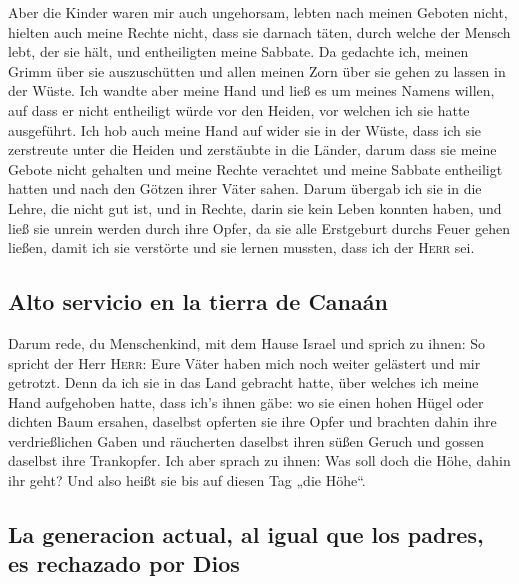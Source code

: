  Aber die Kinder waren mir auch ungehorsam, lebten nach
meinen Geboten nicht, hielten auch meine Rechte nicht, dass sie darnach
täten, durch welche der Mensch lebt, der sie hält, und entheiligten
meine Sabbate. Da gedachte ich, meinen Grimm über sie auszuschütten und
allen meinen Zorn über sie gehen zu lassen in der Wüste. 
Ich wandte aber meine Hand und ließ es um meines Namens willen, auf dass
er nicht entheiligt würde vor den Heiden, vor welchen ich sie hatte
ausgeführt.  Ich hob auch meine Hand auf wider sie in der
Wüste, dass ich sie zerstreute unter die Heiden und zerstäubte in die
Länder,  darum dass sie meine Gebote nicht gehalten und
meine Rechte verachtet und meine Sabbate entheiligt hatten und nach den
Götzen ihrer Väter sahen.  Darum übergab ich sie in die
Lehre, die nicht gut ist, und in Rechte, darin sie kein Leben konnten
haben,  und ließ sie unrein werden durch ihre Opfer, da
sie alle Erstgeburt durchs Feuer gehen ließen, damit ich sie verstörte
und sie lernen mussten, dass ich der \textsc{Herr} sei.

\hypertarget{alto-servicio-en-la-tierra-de-canauxe1n}{%
\subsection{Alto servicio en la tierra de
Canaán}\label{alto-servicio-en-la-tierra-de-canauxe1n}}

 Darum rede, du Menschenkind, mit dem Hause Israel und
sprich zu ihnen: So spricht der Herr \textsc{Herr}: Eure Väter haben
mich noch weiter gelästert und mir getrotzt.  Denn da ich
sie in das Land gebracht hatte, über welches ich meine Hand aufgehoben
hatte, dass ich's ihnen gäbe: wo sie einen hohen Hügel oder dichten Baum
ersahen, daselbst opferten sie ihre Opfer und brachten dahin ihre
verdrießlichen Gaben und räucherten daselbst ihren süßen Geruch und
gossen daselbst ihre Trankopfer.  Ich aber sprach zu
ihnen: Was soll doch die Höhe, dahin ihr geht? Und also heißt sie bis
auf diesen Tag „die Höhe``.

\hypertarget{la-generacion-actual-al-igual-que-los-padres-es-rechazado-por-dios}{%
\subsection{La generacion actual, al igual que los padres, es rechazado
por
Dios}\label{la-generacion-actual-al-igual-que-los-padres-es-rechazado-por-dios}}


